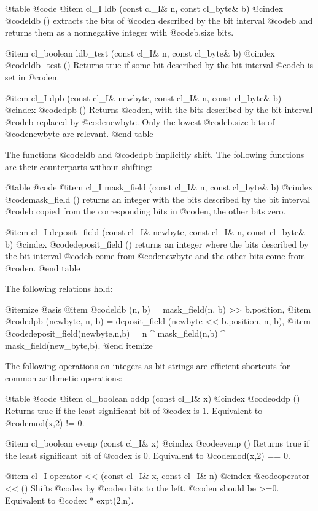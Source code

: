 @table @code
@item cl_I ldb (const cl_I& n, const cl_byte& b)
@cindex @code{ldb ()}
extracts the bits of @code{n} described by the bit interval @code{b}
and returns them as a nonnegative integer with @code{b.size} bits.

@item cl_boolean ldb_test (const cl_I& n, const cl_byte& b)
@cindex @code{ldb_test ()}
Returns true if some bit described by the bit interval @code{b} is set in
@code{n}.

@item cl_I dpb (const cl_I& newbyte, const cl_I& n, const cl_byte& b)
@cindex @code{dpb ()}
Returns @code{n}, with the bits described by the bit interval @code{b}
replaced by @code{newbyte}. Only the lowest @code{b.size} bits of
@code{newbyte} are relevant.
@end table

The functions @code{ldb} and @code{dpb} implicitly shift. The following
functions are their counterparts without shifting:

@table @code
@item cl_I mask_field (const cl_I& n, const cl_byte& b)
@cindex @code{mask_field ()}
returns an integer with the bits described by the bit interval @code{b}
copied from the corresponding bits in @code{n}, the other bits zero.

@item cl_I deposit_field (const cl_I& newbyte, const cl_I& n, const cl_byte& b)
@cindex @code{deposit_field ()}
returns an integer where the bits described by the bit interval @code{b}
come from @code{newbyte} and the other bits come from @code{n}.
@end table

The following relations hold:

@itemize @asis
@item
@code{ldb (n, b) = mask_field(n, b) >> b.position},
@item
@code{dpb (newbyte, n, b) = deposit_field (newbyte << b.position, n, b)},
@item
@code{deposit_field(newbyte,n,b) = n ^ mask_field(n,b) ^ mask_field(new_byte,b)}.
@end itemize

The following operations on integers as bit strings are efficient shortcuts
for common arithmetic operations:

@table @code
@item cl_boolean oddp (const cl_I& x)
@cindex @code{oddp ()}
Returns true if the least significant bit of @code{x} is 1. Equivalent to
@code{mod(x,2) != 0}.

@item cl_boolean evenp (const cl_I& x)
@cindex @code{evenp ()}
Returns true if the least significant bit of @code{x} is 0. Equivalent to
@code{mod(x,2) == 0}.

@item cl_I operator << (const cl_I& x, const cl_I& n)
@cindex @code{operator << ()}
Shifts @code{x} by @code{n} bits to the left. @code{n} should be >=0.
Equivalent to @code{x * expt(2,n)}.

